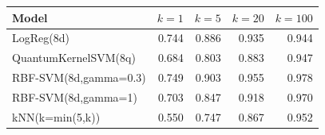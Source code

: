 \begin{tabular}{lrrrr}
\toprule
Model & $k=1$ & $k=5$ & $k=20$ & $k=100$ \\
\midrule
LogReg(8d) & 0.744 & 0.886 & 0.935 & 0.944 \\
QuantumKernelSVM(8q) & 0.684 & 0.803 & 0.883 & 0.947 \\
RBF-SVM(8d,gamma=0.3) & 0.749 & 0.903 & 0.955 & 0.978 \\
RBF-SVM(8d,gamma=1) & 0.703 & 0.847 & 0.918 & 0.970 \\
kNN(k=min(5,k)) & 0.550 & 0.747 & 0.867 & 0.952 \\
\bottomrule
\end{tabular}
